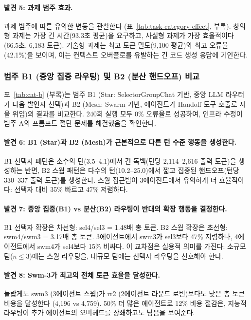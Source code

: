 \documentclass[a4paper,11pt]{article}
\begin{document}
\paragraph{발견 5: 과제 범주 효과.}
과제 범주에 따른 유의한 변동을 관찰한다 (표~\ref{tab:task-category-effect}, 부록). 창의형 과제는 가장 긴 시간(93.3초 평균)을 요구하고, 사실형 과제가 가장 효율적이다 (66.5초, 6,183 토큰). 기술형 과제는 최고 토큰 밀도(9,100 평균)와 최고 오류율(42.1\%)을 보이며, 이는 컨텍스트 오버플로를 유발하는 긴 코드 생성 응답에 기인한다.


\subsubsection{범주 B1 (중앙 집중 라우팅) 및 B2 (분산 핸드오프) 비교}

표~\ref{tab:cat-b} (부록)는 범주 B1 (Star: SelectorGroupChat 기반, 중앙 LLM 라우터가 다음 발언자 선택)과 B2 (Mesh: Swarm 기반, 에이전트가 Handoff 도구 호출로 자율 위임)의 결과를 비교한다. 240회 실행 모두 0\% 오류율로 성공하여, 인프라 수정이 범주 A의 프롬프트 절단 문제를 해결했음을 확인한다.


\paragraph{발견 6: B1 (Star)과 B2 (Mesh)가 근본적으로 다른 턴 수준 행동을 생성한다.}
B1 선택자 패턴은 소수의 턴(3.5--4.1)에서 긴 독백(턴당 2,114--2,616 출력 토큰)을 생성하는 반면, B2 스웜 패턴은 다수의 턴(10.2--25.0)에서 짧고 집중된 핸드오프(턴당 330--337 출력 토큰)를 생성한다. 스웜 접근법이 3에이전트에서 유의하게 더 효율적이다: 선택자 대비 35\% 빠르고 47\% 저렴하다.

\paragraph{발견 7: 중앙 집중(B1) vs 분산(B2) 라우팅이 반대의 확장 행동을 결정한다.}
B1 선택자 확장은 차선형: sel4/sel3 = 1.48배 총 토큰. B2 스웜 확장은 초선형: swm4/swm3 = 3.17배 총 토큰. 3에이전트에서 swm3가 sel3보다 47\% 저렴하나, 4에이전트에서 swm4가 sel4보다 15\% 비싸다. 이 교차점은 실용적 의미를 가진다: 소규모 팀($n \leq 3$)에는 스웜 라우팅을, 대규모 팀에는 선택자 라우팅을 선호해야 한다.

\paragraph{발견 8: Swm-3가 최고의 전체 토큰 효율을 달성한다.}
놀랍게도 swm3 (3에이전트 스웜)가 rr2 (2에이전트 라운드 로빈)보다도 낮은 총 토큰 비용을 달성한다 (4,196 vs 4,759). 50\% 더 많은 에이전트로 12\% 비용 절감은, 지능적 라우팅이 추가 에이전트의 오버헤드를 상쇄하고도 남음을 보여준다.
\end{document}
